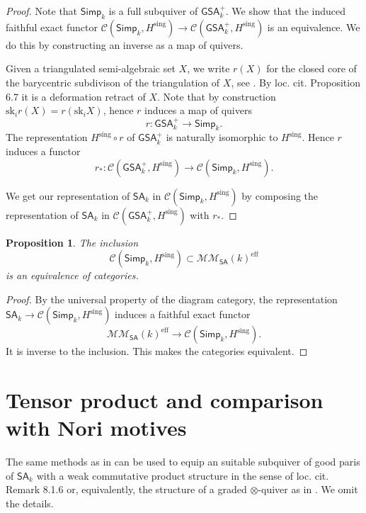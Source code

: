 \documentclass[11pt,a4paper]{amsart}
\newtheorem{prop}[lemma]{Proposition}
\theoremstyle{definition}
\newcommand{\MMSA}{\mathcal{MM}_{\SA}}
\newcommand{\Ch}{\mathcal{C}}
\newcommand{\tensor}{\otimes}
\newcommand{\eff}{\mathrm{eff}}
\newcommand{\sk}{\mathrm{sk}}
\newcommand{\sing}{\mathrm{sing}}
\newcommand{\Hsing}{H^\sing}
\newcommand{\SA}{\mathsf{SA}}
\newcommand{\GSA}{\mathsf{GSA}}
\newcommand{\Simp}{\mathsf{Simp}}
\begin{document}
\begin{proof}
Note that $\Simp_k$ is a full subquiver of $\GSA_k^+$. We show that the
induced faithful exact functor $\Ch(\Simp_k,\Hsing)\to \Ch(\GSA_k^+,\Hsing)$
is an equivalence. We do this by constructing an inverse as a map of quivers.


Given a triangulated semi-algebraic set $X$, we write $r(X)$ for the 
closed core of the barycentric subdivison of the triangulation of $X$, see \cite[Section~6.2]{expperI}. By loc. cit. Proposition 6.7 it
is a deformation retract of $X$. Note that by construction $\sk_i r(X)=r(\sk_i X)$, hence $r$ induces a map of quivers
\[ r:\GSA^+_k\to\Simp_k.\]
The representation $\Hsing\circ r$ of $\GSA_k^+$ is naturally isomorphic to
$\Hsing$. Hence $r$ induces a functor
\[ r_*: \Ch(\GSA^+_k,\Hsing)\to \Ch(\Simp_k,\Hsing).\] 

We get our representation of $\SA_k$ in $\Ch(\Simp_k,\Hsing)$ by composing the representation of $\SA_k$ in $\Ch(\GSA_k^+,\Hsing)$ with $r_*$.
\end{proof}
\begin{prop}\label{prop:equiv}
The inclusion 
\[ \Ch(\Simp_k,\Hsing)\subset\MMSA(k)^\eff\]
 is an equivalence of categories.
\end{prop}
\begin{proof}
By the universal property of the diagram category, the representation
$\SA_k\to\Ch(\Simp_k,\Hsing)$ induces a faithful exact functor
\[ \MMSA(k)^\eff\to \Ch(\Simp_k,\Hsing).\]
It is inverse to the inclusion. 
This makes  the categories equivalent.
\end{proof}



\section{Tensor product and comparison with Nori motives}
The same methods as in \cite[Chapter~9]{period-buch} can be used to equip an suitable subquiver of good paris of $\SA_k$ with a weak commutative product structure in the sense of loc. cit. Remark 8.1.6 or, equivalently, the structure of a graded $\tensor$-quiver as in 
\cite[Definition~2.13]{BHP}. We omit the details.

\end{document}
